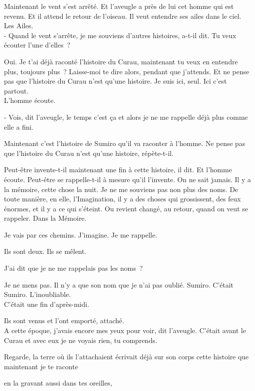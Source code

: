 Maintenant le vent s'est arrêté. Et l'aveugle a près de lui cet homme
qui est revenu. Et il attend le retour de l'oiseau. Il veut entendre ses
ailes dans le ciel. Les Ailes.\\

- Quand le vent s'arrête, je me souviens d'autres histoires, a-t-il dit.
Tu veux écouter l'une d'elles~?

Oui. Je t'ai déjà raconté l'histoire du Curau, maintenant tu veux en
entendre plus, toujours plus~? Laisse-moi te dire alors, pendant que
j'attends. Et ne pense pas que l'histoire du Curau n'est qu'une
histoire. Je suis ici, seul. Ici c'est partout.\\

L'homme écoute.

- Vois, dit l'aveugle, le temps c'est ça et alors je ne me rappelle déjà
plus comme elle a fini.

Maintenant c'est l'histoire de Sumiro qu'il va raconter à l'homme. Ne
pense pas que l'histoire du Curau n'est qu'une histoire, répète-t-il.

Peut-être invente-t-il maintenant une fin à cette histoire, il dit. Et
l'homme écoute. Peut-être se rappelle-t-il à mesure qu'il l'invente. On
ne sait jamais. Il y a la mémoire, cette chose la nuit. Je ne me
souviens pas non plus des noms. De toute manière, en elle,
l'Imagination, il y a des choses qui grossissent, des feux énormes, et
il y a ce qui s'éteint. Ou revient changé, au retour, quand on veut se
rappeler. Dans la Mémoire.

Je vais par ces chemins. J'imagine. Je me rappelle.

Ils sont deux. Ils se mêlent.

J'ai dit que je ne me rappelais pas les noms~?

Je ne mens pas. Il n'y a que son nom que je n'ai pas oublié. Sumiro.
C'était Sumiro. L'inoubliable.\\

C'était une fin d'après-midi.

Ils sont venus et l'ont emporté, attaché.\\

A cette époque, j'avais encore mes yeux pour voir, dit l'aveugle.
C'était avant le Curau et avec eux je ne voyais rien, tu comprends.

Regarde, la terre où ils l'attachaient écrivait déjà sur son corps cette
histoire que maintenant je te raconte

en la gravant aussi dans tes oreilles,

